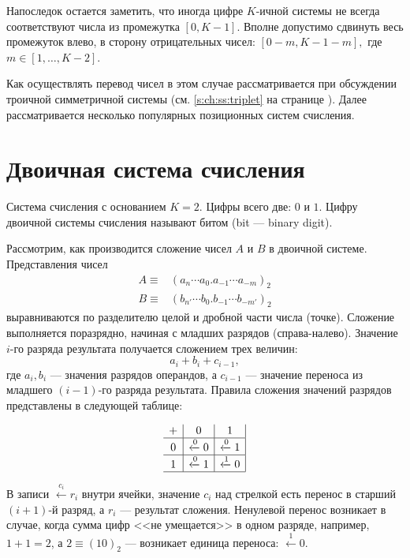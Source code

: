 Напоследок остается заметить, что иногда цифре $K$-ичной системы не всегда соответствуют числа из промежутка $[0,K-1]$. Вполне допустимо сдвинуть весь промежуток влево, в сторону отрицательных чисел: 
\([0-m,K-1-m],\)
где  $m\in[1,\ldots,K-2]$.

Как осуществлять перевод чисел в этом случае рассматривается при обсуждении троичной симметричной системы (см. \ref{s:ch:ss:triplet} на странице \pageref{s:ch:ss:triplet}). Далее рассматривается несколько популярных позиционных систем счисления.



\section{Двоичная система счисления}
\label{s:ch:ss:binaryNS}

Система счисления с основанием $K=2$. Цифры всего две: $0$ и $1$. Цифру двоичной системы счисления называют битом (bit --- binary digit).

Рассмотрим, как производится сложение чисел $A$ и $B$ в двоичной системе. Представления чисел 
\begin{align*}
    A\equiv&(a_n\cdots a_0.a_{-1}\cdots a_{-m})_2\\
    B\equiv&(b_{n'}\cdots b_0.b_{-1}\cdots b_{-m'})_2
\end{align*}
выравниваются по разделителю целой и дробной части числа (точке). Сложение выполняется поразрядно, начиная с младших разрядов (справа-налево). Значение $i$-го разряда результата получается сложением трех величин: 
\[
    a_i+b_i+c_{i-1},
\]
где $a_i, b_i$ --- значения разрядов операндов, а $c_{i-1}$ --- значение переноса из младшего $(i-1)$-го разряда результата. Правила сложения значений разрядов представлены в следующей таблице:

\begin{equation}\label{f:addBinary}
    \begin{array}[c]{c|c|c|}
        + & 0 & 1 \\
        \hline
        0 & \xleftarrow{0}0 & \xleftarrow{0}1\\
        \hline
        1 & \xleftarrow{0}1 & \xleftarrow{1}0 \\
        \hline
    \end{array}
\end{equation}
	
В записи $\xleftarrow{c_i}r_i$ внутри ячейки, значение $c_i$ над стрелкой есть перенос в старший $(i+1)$-й разряд, а $r_i$ --- результат сложения. Ненулевой перенос возникает в случае, когда сумма цифр <<не умещается>> в одном разряде, например, $1+1=2$, а $2\equiv (10)_2$ --- возникает единица переноса: $\xleftarrow{1}0$.

